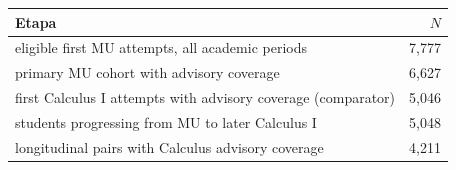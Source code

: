 \begin{tabular}{lr}
\toprule
Etapa & $N$ \\
\midrule
eligible first MU attempts, all academic periods & 7,777 \\
primary MU cohort with advisory coverage & 6,627 \\
first Calculus I attempts with advisory coverage (comparator) & 5,046 \\
students progressing from MU to later Calculus I & 5,048 \\
longitudinal pairs with Calculus advisory coverage & 4,211 \\
\bottomrule
\end{tabular}
